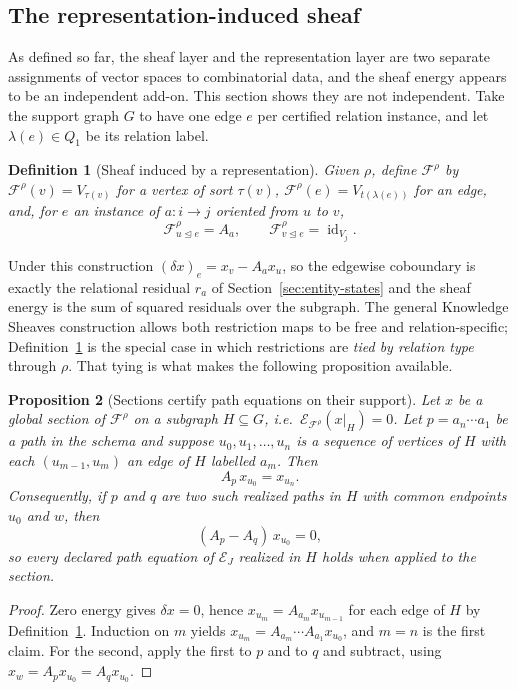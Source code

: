 \documentclass[11pt]{article}
\newtheorem{definition}{Definition}[section]
\newtheorem{proposition}[definition]{Proposition}
\newcommand{\id}{\operatorname{id}}
\newcommand{\Energy}{\mathcal{E}}
\newcommand{\F}{\mathcal{F}}
\begin{document}
\subsection{The representation-induced sheaf}
\label{sec:induced-sheaf}

As defined so far, the sheaf layer and the representation layer are two separate assignments of vector spaces to combinatorial data, and the sheaf energy appears to be an independent add-on. This section shows they are not independent. Take the support graph $G$ to have one edge $e$ per certified relation instance, and let $\lambda(e)\in Q_1$ be its relation label.

\begin{definition}[Sheaf induced by a representation]
\label{def:induced-sheaf}
Given $\rho$, define $\F^{\rho}$ by $\F^{\rho}(v)=V_{\tau(v)}$ for a vertex of sort $\tau(v)$, $\F^{\rho}(e)=V_{t(\lambda(e))}$ for an edge, and, for $e$ an instance of $a:i\to j$ oriented from $u$ to $v$,
\[
\F^{\rho}_{u\unlhd e}=A_a,
\qquad
\F^{\rho}_{v\unlhd e}=\id_{V_j}.
\]
\end{definition}

Under this construction $(\delta x)_e = x_v - A_a x_u$, so the edgewise coboundary is exactly the relational residual $r_a$ of Section~\ref{sec:entity-states} and the sheaf energy is the sum of squared residuals over the subgraph. The general Knowledge Sheaves construction \citep{gebhart2023} allows both restriction maps to be free and relation-specific; Definition~\ref{def:induced-sheaf} is the special case in which restrictions are \emph{tied by relation type} through $\rho$. That tying is what makes the following proposition available.

\begin{proposition}[Sections certify path equations on their support]
\label{prop:section-path-eq}
Let $x$ be a global section of $\F^{\rho}$ on a subgraph $H\subseteq G$, i.e.\ $\Energy_{\F^{\rho}}(x|_H)=0$. Let $p=a_n\cdots a_1$ be a path in the schema and suppose $u_0,u_1,\dots,u_n$ is a sequence of vertices of $H$ with each $(u_{m-1},u_m)$ an edge of $H$ labelled $a_m$. Then
\[
A_p\,x_{u_0}=x_{u_n}.
\]
Consequently, if $p$ and $q$ are two such realized paths in $H$ with common endpoints $u_0$ and $w$, then
\[
(A_p-A_q)\,x_{u_0}=0,
\]
so every declared path equation of $\mathcal{E}_J$ realized in $H$ holds when applied to the section.
\end{proposition}
\begin{proof}
Zero energy gives $\delta x=0$, hence $x_{u_m}=A_{a_m}x_{u_{m-1}}$ for each edge of $H$ by Definition~\ref{def:induced-sheaf}. Induction on $m$ yields $x_{u_m}=A_{a_m}\cdots A_{a_1}x_{u_0}$, and $m=n$ is the first claim. For the second, apply the first to $p$ and to $q$ and subtract, using $x_{w}=A_px_{u_0}=A_qx_{u_0}$.
\end{proof}
\end{document}
